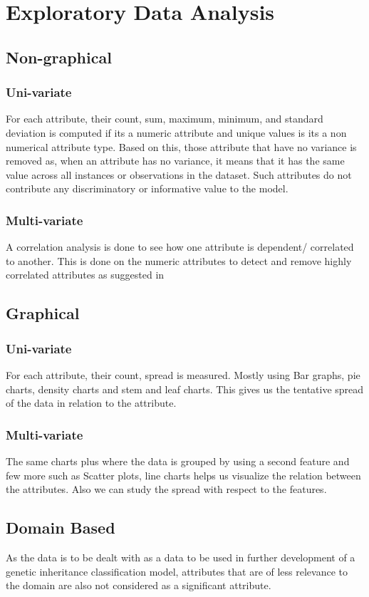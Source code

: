 \section{{\bf{Exploratory Data Analysis}}}

\subsection{Non-graphical}

\subsubsection[]{Uni-variate}
	For each attribute, their count, sum, maximum, minimum, and standard deviation is computed if its a numeric attribute and unique values is its a non numerical attribute type. Based on this, those attribute that have no variance is removed as, when an attribute has no variance, it means that it has the same value across all instances or observations in the dataset. Such attributes do not contribute any discriminatory or informative value to the model.\cite{hughes2018feature}
\subsubsection[]{Multi-variate}
	A correlation analysis is done to see how one attribute is dependent/ correlated to another. This is done on the numeric attributes to detect and remove highly correlated attributes as suggested in \cite{peng2005feature}
\subsection{Graphical}
	\subsubsection[]{Uni-variate}
	For each attribute, their count, spread is measured. Mostly using Bar graphs, pie charts, density charts and stem and leaf charts. This gives us the tentative spread of the data in relation to the attribute.
	\subsubsection[]{Multi-variate}
	The same charts plus where the data is grouped by using a second feature and few more such as Scatter plots, line charts helps us visualize the relation between the attributes. Also we can study the spread with respect to the features.
\subsection{Domain Based}
	As the data is to be dealt with as a data to be used in further development of a genetic inheritance classification model, attributes that are of less relevance to the domain are also not considered as a significant attribute. 

